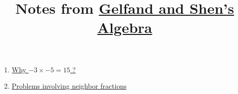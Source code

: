 \documentclass[12pt]{article}
\title{Notes from \href{https://archive.org/details/algebra_gelfand/mode/2up}{Gelfand and Shen's Algebra}}
\date{}
\begin{document}
\maketitle

\begin{enumerate}

\item 	\href{https://github.com/tanv1r/math/tree/master/algebra/2004_gelfand_shen/negative_times_negative/negative_times_negative.pdf}{Why $-3 \times -5 = 15$ ?}

\item \href{https://github.com/tanv1r/math/tree/master/algebra/2004_gelfand_shen/neighbor_fractions/neighbor_fractions.pdf}{Problems involving neighbor fractions}

\end{enumerate}
\end{document}

